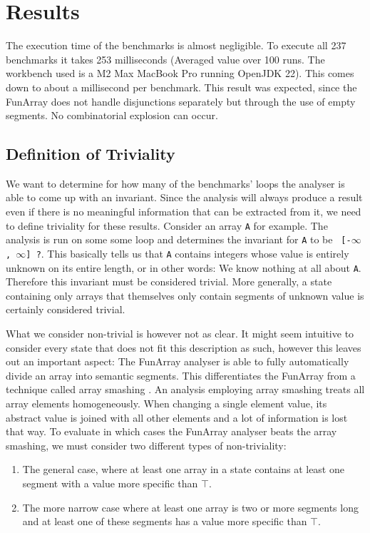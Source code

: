 \section{Results}

The execution time of the benchmarks is almost negligible. To execute all 237 benchmarks it takes 253 milliseconds (Averaged value over 100 runs. The workbench used is a M2 Max MacBook Pro running OpenJDK 22). This comes down to about a millisecond per benchmark. This result was expected, since the FunArray does not handle disjunctions separately but through the use of empty segments. No combinatorial explosion can occur.

\subsection{Definition of Triviality}

We want to determine for how many of the benchmarks' loops the analyser is able to come up with an invariant. Since the analysis will always produce a result even if there is no meaningful information that can be extracted from it, we need to define triviality for these results. Consider an array \texttt{A} for example. The analysis is run on some some loop and determines the invariant for \texttt{A} to be \texttt{\string{0\string} [-$\infty$, $\infty$] ?}. This basically tells us that \texttt{A} contains integers whose value is entirely unknown on its entire length, or in other words: We know nothing at all about \texttt{A}. Therefore this invariant must be considered trivial. More generally, a state containing only arrays that themselves only contain segments of unknown value is certainly considered trivial.

What we consider non-trivial is however not as clear. It might seem intuitive to consider every state that does not fit this description as such, however this leaves out an important aspect: The FunArray analyser is able to fully automatically divide an array into semantic segments. This differentiates the FunArray from a technique called array smashing \cite{cousot2011}. An analysis employing array smashing treats all array elements homogeneously. When changing a single element value, its abstract value is joined with all other elements and a lot of information is lost that way. To evaluate in which cases the FunArray analyser beats the array smashing, we must consider two different types of non-triviality:

\begin{enumerate}
	\item The general case, where at least one array in a state contains at least one segment with a value more specific than $\top$.
	\item The more narrow case where at least one array is two or more segments long and at least one of these segments has a value more specific than $\top$.
\end{enumerate}

